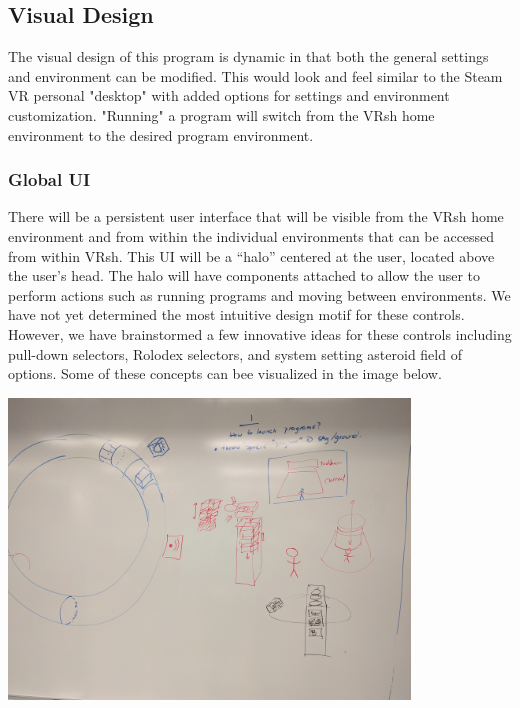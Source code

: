 \documentclass[titlepage,12pt]{article}
\newcommand\name{VRsh}
\begin{document}
\subsection{Visual Design}
The visual design of this program is dynamic in that both the general
settings and environment can be modified. This would look and feel
similar to the Steam VR personal "desktop" with added options for settings
and environment customization. "Running" a program will switch from the {\name}
home environment to the desired program environment.

\subsubsection{Global UI}\label{sec:ui}
There will be a persistent user interface that will be visible from the {\name}
home environment and from within the individual environments that can be
accessed from within \name. This UI will be a ``halo'' centered at the user,
located above the user's head. The halo will have components attached to allow
the user to perform actions such as running programs and moving between
environments. We have not yet determined the most intuitive design motif for
these controls. However, we have brainstormed a few innovative ideas for these
controls including pull-down selectors, Rolodex selectors, and system setting
asteroid field of options. Some of these concepts can bee visualized in the
image below.

\begin{center}
    \includegraphics[width=0.8\textwidth]{./images/visual.jpg}
\end{center}
\end{document}
